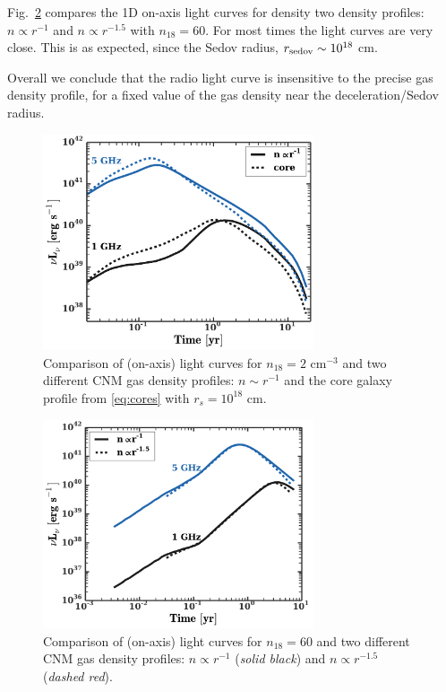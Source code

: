 \documentclass[usenatbib,fleqn]{mnras}
\begin{document}
Fig.~\ref{fig:profs2} compares the 1D on-axis light curves for
density two density profiles: $n\propto r^{-1}$ and $n\propto r^{-1.5}$
with $n_{18}=60$. For most times the light curves are very close.
This is as expected, since the Sedov radius, $r_{\rm sedov}\sim
10^{18}$ cm. 

Overall we conclude that the radio light curve is insensitive to the
precise gas density profile, for a fixed value of the gas density near
the deceleration/Sedov radius.

\begin{figure} 
  \includegraphics[width=8cm]{fig_cores.pdf}
  \caption{\label{fig:cores} Comparison of (on-axis) light curves for
    $n_{18}=2$ cm$^{-3}$ and two different CNM gas density profiles: $n\sim
    r^{-1}$ and the core galaxy profile from \eqref{eq:cores} with
    $r_s=10^{18}$ cm.}
\end{figure}


\begin{figure} 
  \includegraphics[width=8cm]{profs2.pdf}
  \caption{\label{fig:profs2} Comparison of (on-axis) light curves for
    $n_{18}=60$ and two different CNM gas density profiles: $n\propto
    r^{-1}$ ({\it solid black}) and $n\propto r^{-1.5}$ ({\it dashed
      red}).}
\end{figure}
\end{document}
